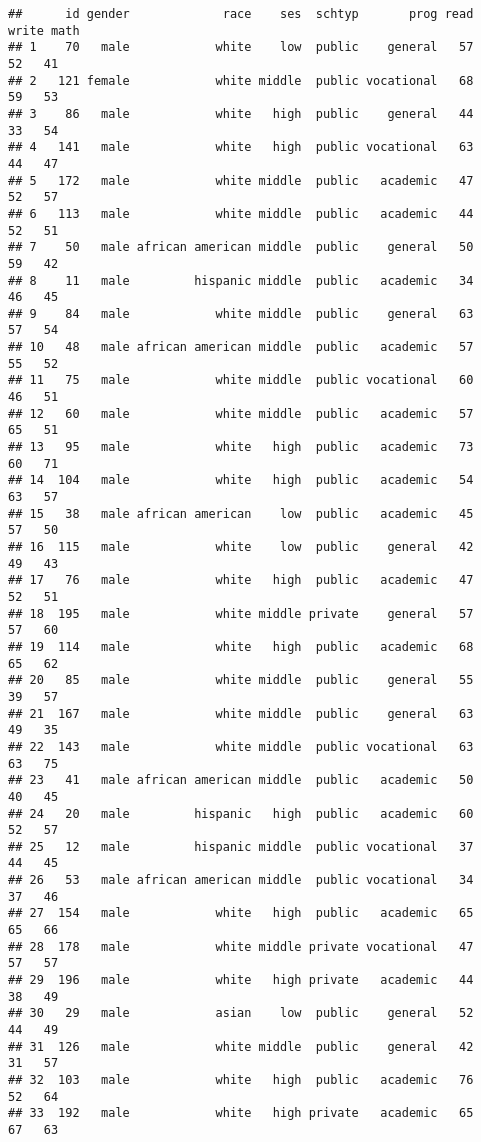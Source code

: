 \documentclass[
]{article}
\begin{document}
\begin{verbatim}
##      id gender             race    ses  schtyp       prog read write math
## 1    70   male            white    low  public    general   57    52   41
## 2   121 female            white middle  public vocational   68    59   53
## 3    86   male            white   high  public    general   44    33   54
## 4   141   male            white   high  public vocational   63    44   47
## 5   172   male            white middle  public   academic   47    52   57
## 6   113   male            white middle  public   academic   44    52   51
## 7    50   male african american middle  public    general   50    59   42
## 8    11   male         hispanic middle  public   academic   34    46   45
## 9    84   male            white middle  public    general   63    57   54
## 10   48   male african american middle  public   academic   57    55   52
## 11   75   male            white middle  public vocational   60    46   51
## 12   60   male            white middle  public   academic   57    65   51
## 13   95   male            white   high  public   academic   73    60   71
## 14  104   male            white   high  public   academic   54    63   57
## 15   38   male african american    low  public   academic   45    57   50
## 16  115   male            white    low  public    general   42    49   43
## 17   76   male            white   high  public   academic   47    52   51
## 18  195   male            white middle private    general   57    57   60
## 19  114   male            white   high  public   academic   68    65   62
## 20   85   male            white middle  public    general   55    39   57
## 21  167   male            white middle  public    general   63    49   35
## 22  143   male            white middle  public vocational   63    63   75
## 23   41   male african american middle  public   academic   50    40   45
## 24   20   male         hispanic   high  public   academic   60    52   57
## 25   12   male         hispanic middle  public vocational   37    44   45
## 26   53   male african american middle  public vocational   34    37   46
## 27  154   male            white   high  public   academic   65    65   66
## 28  178   male            white middle private vocational   47    57   57
## 29  196   male            white   high private   academic   44    38   49
## 30   29   male            asian    low  public    general   52    44   49
## 31  126   male            white middle  public    general   42    31   57
## 32  103   male            white   high  public   academic   76    52   64
## 33  192   male            white   high private   academic   65    67   63

\end{verbatim}
\end{document}
